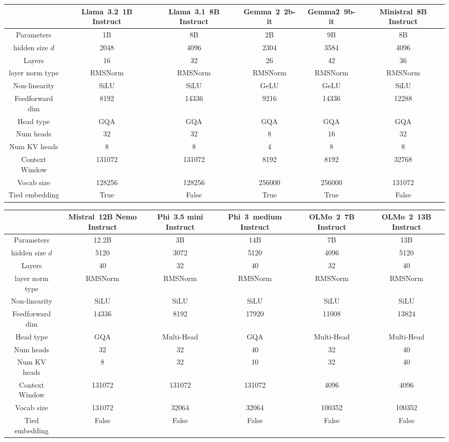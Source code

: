 \begin{table*}[ht]
\centering
\tiny
\caption{Architectural details of the language models used in this study.}
\begin{tabular}{ cccccc }
\hline
 & Llama~3.2~1B Instruct& Llama~3.1~8B Instruct& Gemma~2~2b-it& Gemma2~9b-it &Ministral~8B Instruct
 \\
\hline
Parameters & 1B & 8B & 2B & 9B  &8B\\  
hidden size $d$ & 2048& 4096& 2304& 3584& 4096\\  
Layers & 16& 32& 26& 42&36\\   
layer norm type & RMSNorm & RMSNorm & RMSNorm & RMSNorm & RMSNorm\\  
Non-linearity & SiLU& SiLU& GeLU& GeLU&SiLU\\  
Feedforward dim & 8192& 14336& 9216& 14336&12288\\  
Head type & GQA  & GQA  & GQA  & GQA &GQA \\  
Num heads & 32& 32& 8& 16&32\\  
Num KV heads & 8& 8& 4& 8 & 8\\    
Context Window& 131072& 131072& 8192& 8192&32768\\  
Vocab size & 128256& 128256& 256000& 256000&131072\\
Tied embedding & True& False& True& True&False\\
\hline 
\end{tabular}
\newline
\newline
\newline
\newline
\newline
\centering
\begin{tabular}{ cccccc }
\hline
 & Mistral~12B Nemo Instruct& Phi~3.5 mini Instruct& Phi~3~medium Instruct& OLMo~2~7B Instruct & OLMo~2~13B Instruct\\
\hline
Parameters & 12.2B& 3B & 14B& 7B& 13B\\  
hidden size $d$ & 5120& 3072 & 5120& 4096& 5120\\  
Layers & 40& 32 & 40& 32& 40\\   
layer norm type & RMSNorm & RMSNorm & RMSNorm & RMSNorm& RMSNorm\\  
Non-linearity & SiLU& SiLU& SiLU& SiLU& SiLU\\  
Feedforward dim & 14336& 8192&  17920& 11008& 13824\\  
Head type & GQA & Multi-Head & GQA & Multi-Head & Multi-Head \\  
Num heads & 32& 32 & 40& 32 & 40\\  
Num KV heads & 8& 32& 10& 32 & 40\\   
Context Window & 131072& 131072& 131072& 4096& 4096\\  
Vocab size & 131072& 32064& 32064& 100352& 100352\\
Tied embedding & False& False& False& False& False\\
\hline 
\end{tabular}
\label{tab:model_arch}
\end{table*}


